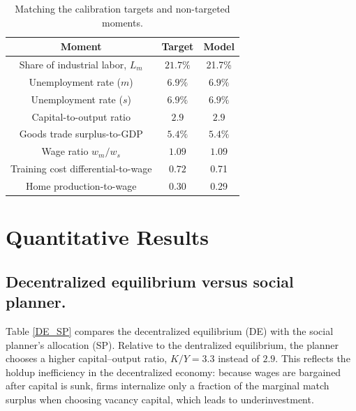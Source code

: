 \documentclass[12pt]{article} %
\theoremstyle{definition}
\begin{document}
\begin{table}[h!]
\centering
\caption{Matching the calibration targets and non-targeted moments.}\label{table_calibration_targets}
\begin{tabular}{||c c c||}\hline
\textbf{Moment} & \textbf{Target} & \textbf{Model} \\\hline\hline
Share of industrial labor, $L_m$ & $ 21.7\%$ & 21.7\% \\
Unemployment rate ($m$)  & $ 6.9\%$ & $6.9\%$ \\
Unemployment rate ($s$)  & $ 6.9\%$ & $6.9\%$ \\
Capital-to-output ratio & $ 2.9$ & $2.9$ \\
Goods trade surplus-to-GDP & $5.4\%$ &  $5.4\%$ \\
Wage ratio $w_m/w_s$ & $1.09$ & $1.09$  \\
Training cost differential-to-wage & $0.72$ & 0.71 \\
Home production-to-wage     &  $0.30$   &   0.29  \\
\hline
\end{tabular}
\end{table}

\section{Quantitative Results}\label{section results} 

\subsection{Decentralized equilibrium versus social planner.}
Table \ref{DE_SP} compares the decentralized equilibrium (DE) with the social planner's allocation (SP). Relative to the dentralized equilibrium, the planner chooses a higher capital–output ratio, $K/Y=3.3$ instead of  $2.9$. This reflects the holdup inefficiency in the decentralized economy: because wages are bargained after capital is sunk, firms internalize only a fraction of the marginal match surplus when choosing vacancy capital, which leads to underinvestment. 
\end{document}
